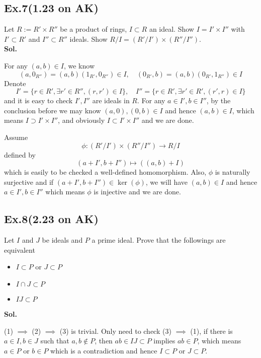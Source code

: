 \documentclass[lang=en,11pt,a4paper,citestyle =authoryear]{elegantpaper}
\begin{document}
\subsection*{Ex.7(1.23 on AK)} 
Let $R:=R'\times R''$ be a product of rings, $I\subset R$ an ideal. Show $I = I'\times I''$ with $I'\subset R'$ and $I''\subset R''$ ideals. Show $R/I = (R'/I')\times(R''/I'')$.
\vspace{0.5em}\\
\textbf{Sol.} \par
For any $(a,b) \in I$, we know
\[
(a,0_{R''}) = (a,b)(1_{R'},0_{R''}) \in I,\quad (0_{R'},b) = (a,b)(0_{R'},1_{R''})\in I
\]
Denote
\[
I' = \{r\in R',\exists r'\in R'', (r,r')\in I\},\quad I'' = \{r\in R',\exists r'\in R', (r',r)\in I\}
\]
and it is easy to check $I',I''$ are ideals in $R$. For any $a\in I',b\in I''$, by the conclusion before we may know $(a,0),(0,b) \in I$ and hence $(a,b)\in I$, which means $I\supset I'\times I''$, and obviously $I\subset I'\times I''$ and we are done.\par
Assume
\[
\phi:(R'/I')\times (R''/I'') \to R/I
\]
defined by
\[
(a+I',b+I'')\mapsto ((a,b)+I)
\]
which is easily to be checked a well-defined homomorphism. Also, $\phi$ is naturally surjective and if $(a+I',b+I'')\in \ker(\phi)$, we will have $(a,b) \in I$ and hence $a\in I',b\in I''$ which means $\phi$ is injective and we are done.
\vspace{0.5em}

\subsection*{Ex.8(2.23 on AK)} 
Let $I$ and $J$ be ideals and $P$ a prime ideal. Prove that the followings are equivalent
\begin{itemize}
    \item $I\subset P$ or $J\subset P$
    \item $I\cap J \subset P$
    \item $IJ \subset P$
\end{itemize}
\vspace{0.5em}
\textbf{Sol.}\par
(1) $\implies$ (2) $\implies$ (3) is trivial. Only need to check (3) $\implies$ (1), if there is $a\in I, b\in J$ such that $a,b\notin P$, then $ab\in IJ \subset P$ implies $ab\in P$, which means $a\in P$ or $b\in P$ which is a contradiction and hence $I\subset P$ or $J\subset P$.
\vspace{0.5em}


\addappheadtotoc
\end{document}
